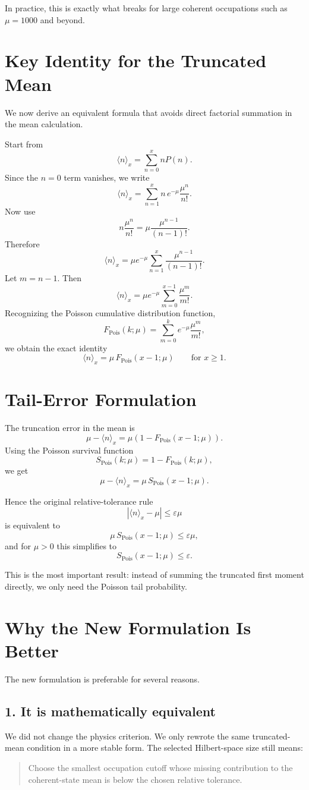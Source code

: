 \documentclass[12pt]{article}
\begin{document}
In practice, this is exactly what breaks for large coherent occupations such as $\mu = 1000$ and beyond.

\section*{Key Identity for the Truncated Mean}
We now derive an equivalent formula that avoids direct factorial summation in the mean calculation.

Start from
\[
\langle n \rangle_x = \sum_{n=0}^{x} nP(n).
\]
Since the $n=0$ term vanishes, we write
\[
\langle n \rangle_x = \sum_{n=1}^{x} n\,e^{-\mu}\frac{\mu^n}{n!}.
\]
Now use
\[
n\frac{\mu^n}{n!} = \mu\frac{\mu^{n-1}}{(n-1)!}.
\]
Therefore
\[
\langle n \rangle_x
= \mu e^{-\mu}\sum_{n=1}^{x}\frac{\mu^{n-1}}{(n-1)!}.
\]
Let $m=n-1$. Then
\[
\langle n \rangle_x
= \mu e^{-\mu}\sum_{m=0}^{x-1}\frac{\mu^m}{m!}.
\]
Recognizing the Poisson cumulative distribution function,
\[
F_{\text{Pois}}(k;\mu)
= \sum_{m=0}^{k} e^{-\mu}\frac{\mu^m}{m!},
\]
we obtain the exact identity
\[
\boxed{
\langle n \rangle_x = \mu\,F_{\text{Pois}}(x-1;\mu)
}
\qquad \text{for } x \ge 1.
\]

\section*{Tail-Error Formulation}
The truncation error in the mean is
\[
\mu - \langle n \rangle_x
= \mu\left(1 - F_{\text{Pois}}(x-1;\mu)\right).
\]
Using the Poisson survival function
\[
S_{\text{Pois}}(k;\mu) = 1 - F_{\text{Pois}}(k;\mu),
\]
we get
\[
\boxed{
\mu - \langle n \rangle_x
= \mu\,S_{\text{Pois}}(x-1;\mu)
}.
\]

Hence the original relative-tolerance rule
\[
\left|\langle n \rangle_x - \mu\right| \le \varepsilon\mu
\]
is equivalent to
\[
\mu\,S_{\text{Pois}}(x-1;\mu) \le \varepsilon\mu,
\]
and for $\mu>0$ this simplifies to
\[
\boxed{
S_{\text{Pois}}(x-1;\mu) \le \varepsilon
}.
\]

This is the most important result: instead of summing the truncated first moment directly, we only need the Poisson tail probability.

\section*{Why the New Formulation Is Better}
The new formulation is preferable for several reasons.

\subsection*{1. It is mathematically equivalent}
We did not change the physics criterion. We only rewrote the same truncated-mean condition in a more stable form. The selected Hilbert-space size still means:
\begin{quote}
Choose the smallest occupation cutoff whose missing contribution to the coherent-state mean is below the chosen relative tolerance.
\end{quote}
\end{document}
